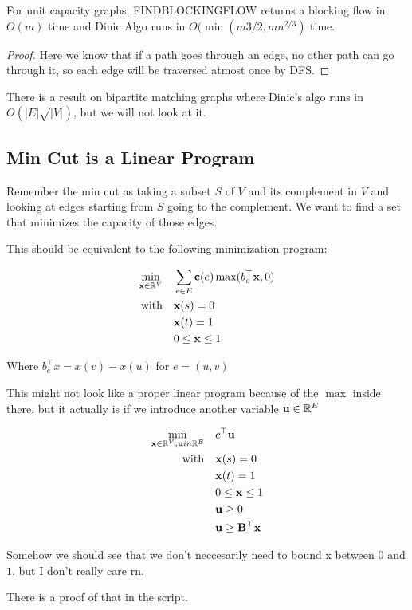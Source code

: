 \begin{lema}
    For unit capacity graphs, FINDBLOCKINGFLOW returns a blocking flow in $O(m)$ time and Dinic Algo runs in $O(\min (m{3/2}, mn^{2/3})$ time.
\end{lema}

\begin{proof}
    Here we know that if a path goes through an edge, no other path can go through it, so each edge will be traversed atmost once by DFS.
\end{proof}

There is a result on bipartite matching graphs where Dinic's algo runs in $O(|E| \sqrt{|V|})$, but we will not look at it.


\subsection{Min Cut is a Linear Program}

Remember the min cut as taking a subset $S$ of $V$ and its complement in $V$ and looking at edges starting from $S$ going to the complement. We want to find a set that minimizes the capacity of those edges.

This should be equivalent to the following minimization program:

\begin{equation}
    \begin{aligned}
    \min _{\mathbf{x}\in \mathbb{R}^V} &  \quad \sum_{e\in E} \mathbf{c} (e) \max(b_e ^\top \mathbf{x}, 0)\\
    \text{with} & \quad  \mathbf{x}(s) = 0\\
    & \quad \mathbf{x}(t) = 1 \\
    & \quad 0 \leq \mathbf{x} \leq 1
\end{aligned}
\end{equation}

Where $b_e^\top x = x(v) - x(u)$ for $e = (u,v)$

This might not look like a proper linear program because of the $\max$ inside there, but it actually is if we introduce another variable $\mathbf{u} \in \mathbb{R}^E$

\begin{equation}
    \begin{aligned}
    \min _{\mathbf{x}\in \mathbb{R}^V, \mathbf{u} in \mathbb{R}^E} &  \quad c^\top \mathbf{u}\\
    \text{with} & \quad  \mathbf{x}(s) = 0\\
    & \quad \mathbf{x}(t) = 1 \\
    & \quad 0 \leq \mathbf{x} \leq 1\\
    & \quad \mathbf{u} \geq 0\\
    & \quad \mathbf{u} \geq \mathbf{B^\top x}
\end{aligned}
\end{equation}

Somehow we should see that we don't neccesarily need to bound x between $0$ and $1$, but I don't really care rn.

There is a proof of that in the script.